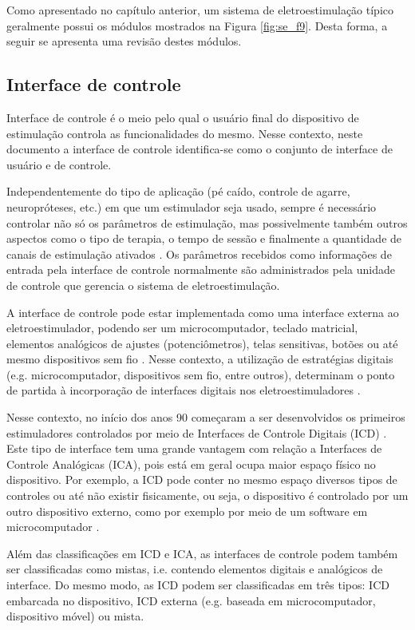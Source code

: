 Como apresentado no capítulo anterior, um sistema de eletroestimulação típico geralmente possui os módulos mostrados na Figura \ref{fig:se_f9}. Desta forma, a seguir se apresenta uma revisão destes módulos.

\subsection{Interface de controle}
Interface de controle é o meio pelo qual o usuário final do dispositivo de estimulação controla as funcionalidades do mesmo. Nesse contexto, neste documento a interface de controle identifica-se como o conjunto de interface de usuário e de controle. 

Independentemente do tipo de aplicação (pé caído, controle de agarre, neuropróteses, etc.) em que um estimulador seja usado, sempre é necessário controlar não só os parâmetros de estimulação, mas possivelmente também outros aspectos como o tipo de terapia, o tempo de sessão e finalmente a quantidade de canais de estimulação ativados \cite{Gaiotto2012}. Os parâmetros recebidos como informações de entrada pela interface de controle normalmente são administrados pela unidade de controle que gerencia o sistema de eletroestimulação.

A interface de controle pode estar implementada como uma interface externa ao eletroestimulador, podendo ser um microcomputador, teclado matricial, elementos analógicos de ajustes (potenciômetros), telas sensitivas, botões ou até mesmo dispositivos sem fio \cite{Gaiotto2012}. Nesse contexto, a utilização de estratégias digitais (e.g. microcomputador, dispositivos sem fio, entre outros), determinam o ponto de partida à incorporação de interfaces digitais nos eletroestimuladores \cite{Bijak2002}.

Nesse contexto, no início dos anos 90 começaram a ser desenvolvidos os primeiros estimuladores controlados por meio de Interfaces de Controle Digitais (\acrshort{ICD}) \cite{Kaczmarek1991}. Este tipo de interface tem uma grande vantagem com relação a Interfaces de Controle Analógicas (\acrshort{ICA}), pois está em geral ocupa maior espaço físico no dispositivo. Por exemplo, a \acrshort{ICD} pode conter no mesmo espaço diversos tipos de controles ou até não existir fisicamente, ou seja, o dispositivo é controlado por um outro dispositivo externo, como por exemplo por meio de um software em microcomputador \cite{Wu2002, Bijak2002}. 

Além das classificações em \acrshort{ICD} e \acrshort{ICA}, as interfaces de controle podem também ser classificadas como mistas, i.e. contendo elementos digitais e analógicos de interface. Do mesmo modo, as \acrshort{ICD} podem ser classificadas em três tipos: \acrshort{ICD} embarcada no dispositivo, \acrshort{ICD} externa (e.g. baseada em microcomputador, dispositivo móvel) ou mista.

